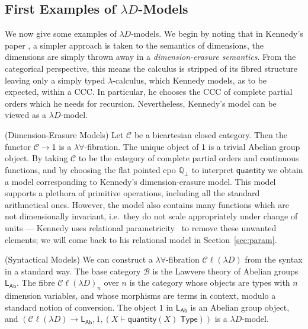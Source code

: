 \documentclass[a4paper,UKenglish]{lipics}
\theoremstyle{plain}
\newcommand{\ra}{\rightarrow}
\newcommand{\msf}[1]{\mathsf{#1}} %
\newcommand{\LAb}{\msf{L}_{\msf{Ab}}}
\newcommand{\terminal}{\msf{1}}
\newcommand{\ClLD}{\mathcal{C\ell}(\lambda{}D)} %
\newcommand{\B}{\mathcal{B}}
\newcommand{\C}{\mathcal{C}}
\newcommand{\bbQ}{\mathbb{Q}}
\newcommand{\qnt}{\msf{quantity}}
\newcommand{\Tj}[2]{#1 \vdash #2 \; \msf{ Type}}
\begin{document}
\subsection{First Examples of $\lambda D$-Models}
We now give some examples of $\lambda D$-models. We begin by noting that in Kennedy's paper \cite{Kennedy:1997:RPU:263699.263761}, a simpler approach is taken to the semantics of dimensions, the dimensions are simply thrown away in a {\em dimension-erasure semantics}. From the categorical perspective, this means the calculus is stripped of its fibred structure leaving only a simply typed $\lambda$-calculus, which Kennedy models, as to be expected, within a CCC. In particular, he chooses the CCC of complete partial orders which he needs for recursion. Nevertheless, Kennedy's model can be viewed as a $\lambda D$-model.


\begin{example}(Dimension-Erasure Models)
\label{ex:UnitErasure}
Let $\C$ be a bicartesian closed category. Then the functor $\C \ra
\terminal$ is a $\lambda\forall$-fibration. The unique object of
$\terminal$ is a trivial Abelian group object. By taking $\C$ to be
the category of complete partial orders and continuous functions, and
by choosing the flat pointed cpo $\bbQ_{\bot}$ to interpret $\qnt$ we
obtain a model corresponding to Kennedy's dimension-erasure
model. This model supports a plethora of primitive operations,
including all the standard arithmetical ones. However, the model also
contains many functions which are not dimensionally invariant, i.e.\
they do not scale appropriately under change of units --- Kennedy uses
relational parametricity~\cite{reynolds1983types} to remove these
unwanted elements; we will come back to his relational model in
Section~\ref{sec:param}.
\end{example}


\begin{example}(Syntactical Models)
We can construct a $\lambda \forall$-fibration $\ClLD$ from the syntax in a standard way. The base category $\B$ is the Lawvere theory of Abelian groups $\LAb$. The fibre $\ClLD_n$ over $n$ is the category whose objects are types with $n$ dimension variables, and whose morphisms are terms in context, modulo a standard notion of conversion. The object $1$ in $\LAb$ is an Abelian group object, and $(\ClLD\to\LAb,1,(\Tj X{\qnt(X)}))$ is a $\lambda D$-model.
\end{example}
\end{document}
